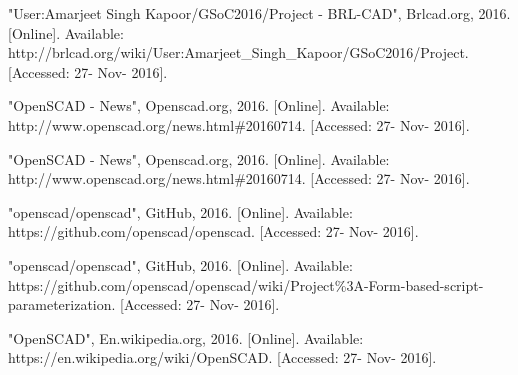 \documentclass[12pt,includeheadfoot,a4paper]{report}
\begin{document}
 
\begin{thebibliography}{22}

\bibitem{} "User:Amarjeet Singh Kapoor/GSoC2016/Project - BRL-CAD", Brlcad.org, 2016. [Online]. Available: http://brlcad.org/wiki/User:Amarjeet\_Singh\_Kapoor/GSoC2016/Project. [Accessed: 27- Nov- 2016].

\bibitem{} "OpenSCAD - News", Openscad.org, 2016. [Online]. Available: http://www.openscad.org/news.html\#20160714. [Accessed: 27- Nov- 2016].

\bibitem{} "OpenSCAD - News", Openscad.org, 2016. [Online]. Available: http://www.openscad.org/news.html\#20160714. [Accessed: 27- Nov- 2016].


\bibitem{} "openscad/openscad", GitHub, 2016. [Online]. Available: https://github.com/openscad/openscad. [Accessed: 27- Nov- 2016].

\bibitem{} "openscad/openscad", GitHub, 2016. [Online]. Available: https://github.com/openscad/openscad/wiki/Project\%3A-Form-based-script-parameterization. [Accessed: 27- Nov- 2016].

\bibitem{} "OpenSCAD", En.wikipedia.org, 2016. [Online]. Available: https://en.wikipedia.org/wiki/OpenSCAD. [Accessed: 27- Nov- 2016].

\end{thebibliography}
\end{document}
